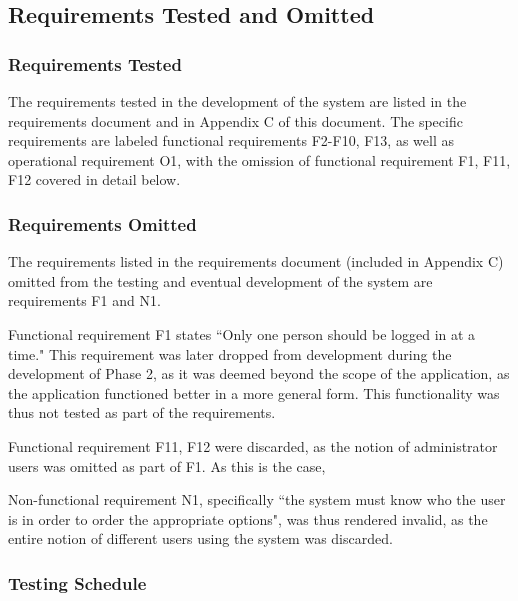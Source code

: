 \documentclass[12pt]{article}
\begin{document}
\subsection{Requirements Tested and Omitted}
\subsubsection{Requirements Tested} \label{rt:1}
       
{
The requirements tested in the development of the system are listed in the requirements document and in Appendix C of this document. The specific requirements are labeled functional requirements F2-F10, F13, as well as operational requirement O1, with the omission of functional requirement F1, F11, F12 covered in detail below.
}

\subsubsection{Requirements Omitted} \label{rt:2}

{
The requirements listed in the requirements document (included in Appendix C) omitted from the testing and eventual development of the system are requirements F1 and N1.

Functional requirement F1 states ``Only one person should be logged in at a time." This requirement was later dropped from development during the development of Phase 2, as it was deemed beyond the scope of the application, as the application functioned better in a more general form. This functionality was thus not tested as part of the requirements.

Functional requirement F11, F12 were discarded, as the notion of administrator users was omitted as part of F1. As this is the case,

Non-functional requirement N1, specifically ``the system must know who the user is in order to order the appropriate options", was thus rendered invalid, as the entire notion of different users using the system was discarded.
}

\subsubsection{Testing Schedule}
\end{document}
